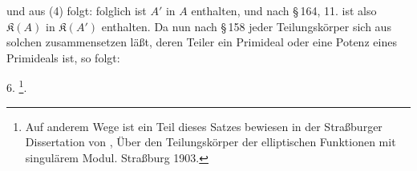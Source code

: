 
und aus (4) folgt:
folglich ist $A'$ in $A$ enthalten, und nach \S\,164, 11. ist also $\mathfrak{K}(A)$ in $\mathfrak{K}(A')$ enthalten. Da nun nach \S\,158 jeder Teilungsk\"orper sich aus solchen zusammensetzen l\"a\ss t, deren Teiler ein Primideal oder eine Potenz eines Primideals ist, so folgt:

6. \footnote{Auf anderem Wege ist ein Teil dieses Satzes bewiesen in der Stra\ss burger Dissertation von , \glqq{}\"Uber den Teilungsk\"orper der elliptischen Funktionen mit singul\"arem Modul\grqq{}. Stra\ss burg 1903.}.
